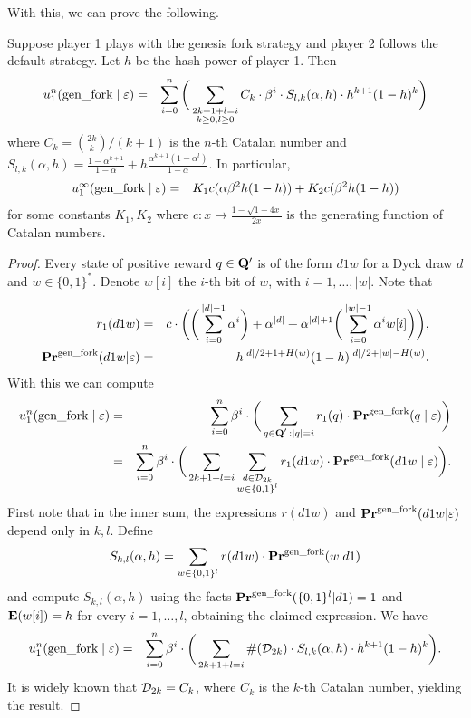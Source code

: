 With this, we can prove the following.
\begin{myprop*}
Suppose player 1 plays with the genesis fork strategy and player 2 follows the default strategy. Let $h$ be the hash power of player 1. Then
\begin{eqnarray*}
	u_1^n(\text{\rm gen\_fork} \mid \varepsilon) & = & \sum_{i=0}^{n} \bigg( \sum_{\substack{2k+1+l=i\\k\geq 0,l\geq 0}} C_k\cdot \beta^{i} \cdot S_{l,k}(\alpha,h)\cdot h^{k+1}(1-h)^{k} \bigg)
\end{eqnarray*}
where $C_k={2k\choose k}/(k+1)$ is the $n$-th Catalan number and $S_{l,k}(\alpha,h)=\frac{1-\alpha^{k+1}}{1-\alpha}+h\frac{\alpha^{k+1}(1-\alpha^l)}{1-\alpha}$. In particular,
\begin{eqnarray*}
	u_1^\infty(\text{\rm gen\_fork} \mid \varepsilon) & = & K_1 c(\alpha\beta^2h(1-h))+K_2 c(\beta^2h(1-h))
\end{eqnarray*}
for some constants $K_1,K_2$ where $c:x\mapsto \frac{1-\sqrt{1-4x}}{2x}$ is the generating function of Catalan numbers.

\end{myprop*}
\begin{proof} Every state of positive reward $q\in\mathbf{Q}'$ is of the form $d1w$ for a Dyck draw $d$ and $w\in \{0,1\}^\ast$. Denote $w[i]$ the $i$-th bit of $w$, with $i=1,\dots,|w|$. Note that

\begin{eqnarray*}
r_1(d1w) &=& c\cdot \bigg(\bigg(\sum_{i=0}^{|d|-1}\alpha^i \bigg)+\alpha^{|d|}+\alpha^{|d|+1}\bigg(\sum_{i=0}^{|w|-1}\alpha^i w[i]\bigg)\bigg),\\
\mathbf{Pr}^{\text{\rm gen\_fork}}(d1w|\varepsilon) &=& h^{|d|/2+1+H(w)}(1-h)^{|d|/2+|w|-H(w)}.
\end{eqnarray*} 
With this we can compute 
\begin{eqnarray*}
	u_1^n(\text{\rm gen\_fork} \mid \varepsilon) & = & \sum_{i=0}^{n}\beta^{i} \cdot  \bigg(\sum_{\substack{q \in \mathbf{Q}' \,: |q| = i}} r_1(q) \cdot 
	\mathbf{Pr}^{\text{\rm gen\_fork}}(q \mid \varepsilon)\bigg)\\
								& = & \sum_{i=0}^{n}\beta^{i} \cdot  \bigg(\sum_{2k+1+l=i}\sum_{\substack{d\in \mathcal{D}_{2k}\\w\in\{0,1\}^l}} r_1(d1w) \cdot 
	\mathbf{Pr}^{\text{\rm gen\_fork}}(d1w \mid \varepsilon)\bigg).
\end{eqnarray*}
First note that in the inner sum, the expressions $r(d1w)$ and $\mathbf{Pr}^{\text{\rm gen\_fork}}(d1w|\varepsilon)$ depend only in $k,l$. Define
$$S_{k,l}(\alpha,h)=\sum_{w\in\{0,1\}^l}r(d1w)\cdot \mathbf{Pr}^{\text{\rm gen\_fork}}(w|d1)$$
and compute $S_{k,l}(\alpha,h)$ using the facts $\mathbf{Pr}^{\text{\rm gen\_fork}}(\{0,1\}^l|d1)=1$ and $\mathbf{E}(w[i])=h$ for every $i=1,\dots,l$, obtaining the claimed expression. We have
\begin{eqnarray*}
u_1^n(\text{\rm gen\_fork} \mid \varepsilon) & = & \sum_{i=0}^{n}\beta^{i} \cdot  \bigg(\sum_{2k+1+l=i} \#(\mathcal{D}_{2k})\cdot S_{l,k}(\alpha,h)\cdot h^{k+1}(1-h)^{k}\bigg).
\end{eqnarray*}
It is widely known that $\mathcal{D}_{2k}=C_k$, where $C_k$ is the $k$-th Catalan number, yielding the result. 
\end{proof}


